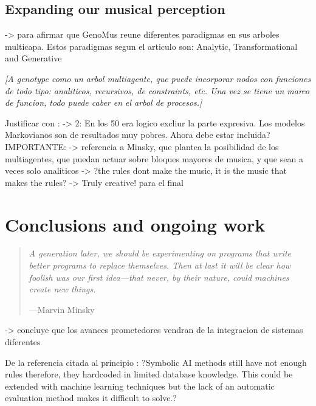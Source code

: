 \documentclass{article}
\begin{document}
\subsection{Expanding our musical perception}


{\color{red}

\cite{quteprints6544} -> para afirmar que GenoMus reune diferentes paradigmas en sus arboles multicapa. Estos paradigmas segun el articulo son: Analytic, Transformational and Generative
}

{\color{gray} \textsl{[A genotype como un arbol multiagente, que puede incorporar nodos con funciones de todo tipo: analiticos, recursivos, de constraints, etc. Una vez se tiene un marco de funcion, todo puede caber en el arbol de procesos.]}}


{\color{red}

Justificar con \cite{LopezdeMantaras:2006:MMA:1565082.1565089}:
	-> 2: En los 50 era logico excliur la parte expresiva. Los modelos Markovianos son de resultados muy pobres. Ahora debe estar incluida?
IMPORTANTE:
	-> referencia a Minsky, que plantea la posibilidad de los multiagentes, que puedan actuar sobre bloques mayores de musica, y que sean a veces solo analiticos
	-> ?the rules dont make the music, it is the music that makes the rules?
	-> Truly creative! para el final
}


\section{Conclusions and ongoing work}

\begin{samepage}
\begin{quotation}
\textsl{A generation later, we should be experimenting on programs
that write better programs to replace themselves. Then
at last it will be clear how foolish was our first idea---that
never, by their nature, could machines create new things.}

---Marvin Minsky \cite{DBLP:journals/aim/Minsky82}
\end{quotation}
\end{samepage}

{\color{red}

\cite{Papadopoulos99aimethods} -> concluye que los avances prometedores vendran de la integracion de sistemas diferentes

De la referencia citada al principio \cite{LopezRincon2018}: ?Symbolic AI methods still have not enough rules therefore,
they hardcoded in limited database knowledge. This could be
extended with machine learning techniques but the lack of an
automatic evaluation method makes it difficult to solve.?

}
\end{document}
